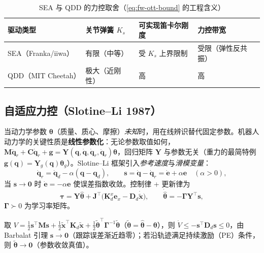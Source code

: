 \begin{table}[H]\centering\small
\caption{SEA 与 QDD 的力控取舍（\cref{eq:fw-ott-bound} 的工程含义）}
\label{tab:fw-sea-qdd}
\begin{tabular}{llll}
\toprule
驱动类型 & 关节弹簧 $K_s$ & 可实现笛卡尔刚度 & 力控带宽 \\
\midrule
SEA（Franka/iiwa） & 有限（中等） & 受 $K_s$ 上界限制 & 受限（弹性反共振） \\
QDD（MIT Cheetah） & 极大（近刚性） & 高 & 高 \\
\bottomrule
\end{tabular}
\end{table}

\subsection{自适应力控（Slotine--Li 1987）}
\label{sec:fw-adaptive}

当动力学参数 $\boldsymbol{\theta}$（质量、质心、摩擦）\emph{未知}时，用在线辨识替代固定参数。机器人动力学的关键性质是\textbf{线性参数化}：无论参数取值如何，$\mathbf{M}\ddot{\mathbf{q}}_r+\mathbf{C}\dot{\mathbf{q}}_r+\mathbf{g}=\mathbf{Y}(\mathbf{q},\dot{\mathbf{q}},\dot{\mathbf{q}}_r,\ddot{\mathbf{q}}_r)\boldsymbol{\theta}$，回归矩阵 $\mathbf{Y}$ 与参数无关（重力的最简特例 $\mathbf{g}(\mathbf{q})=\mathbf{Y}_g(\mathbf{q})\boldsymbol{\theta}_g$）。Slotine--Li\cite{slotine1987adaptive} 框架引入\emph{参考速度}与\emph{滑模变量}：
\begin{equation}
  \dot{\mathbf{q}}_r=\dot{\mathbf{q}}_d-\alpha(\mathbf{q}-\mathbf{q}_d),\qquad
  \mathbf{s}=\dot{\mathbf{q}}-\dot{\mathbf{q}}_r=\dot{\mathbf{e}}+\alpha\mathbf{e}\quad(\alpha>0),
  \label{eq:fw-sliding}
\end{equation}
当 $\mathbf{s}\to\mathbf{0}$ 时 $\dot{\mathbf{e}}=-\alpha\mathbf{e}$ 使误差指数收敛。控制律 + 更新律为
\begin{equation}
  \boldsymbol{\tau}=\mathbf{Y}\hat{\boldsymbol{\theta}}+\mathbf{J}^\top\!\big(\mathbf{K}_d^x\mathbf{e}_x-\mathbf{D}_d\dot{\tilde{\mathbf{x}}}\big),\qquad
  \dot{\hat{\boldsymbol{\theta}}}=-\boldsymbol{\Gamma}\mathbf{Y}^\top\mathbf{s},
  \label{eq:fw-adaptive-law}
\end{equation}
$\boldsymbol{\Gamma}\succ0$ 为学习率矩阵。

\begin{theorem}[自适应力控的跟踪收敛]
\label{thm:fw-adaptive}
取 $V=\tfrac12\mathbf{s}^\top\mathbf{M}\mathbf{s}+\tfrac12\tilde{\mathbf{x}}^\top\mathbf{K}_d\tilde{\mathbf{x}}+\tfrac12\tilde{\boldsymbol{\theta}}^\top\boldsymbol{\Gamma}^{-1}\tilde{\boldsymbol{\theta}}$（$\tilde{\boldsymbol{\theta}}=\hat{\boldsymbol{\theta}}-\boldsymbol{\theta}$），则 $\dot V\le-\mathbf{s}^\top\mathbf{D}_d\mathbf{s}\le0$，由 Barbalat 引理 $\mathbf{s}\to\mathbf{0}$（跟踪误差渐近趋零）；若沿轨迹满足持续激励（PE）条件，则 $\tilde{\boldsymbol{\theta}}\to\mathbf{0}$（参数收敛真值）。
\end{theorem}

